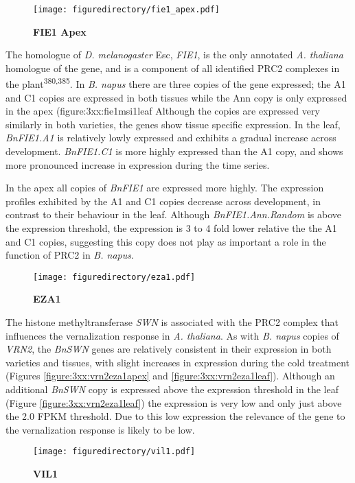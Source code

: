 \documentclass[12pt,]{book}
\begin{document}
\begin{figure}[htbp]
\centering
\texttt{[image: figuredirectory/fie1\_apex.pdf]}
\caption{\textbf{FIE1 Apex}}\label{figure:3xx:fie1apex}
\end{figure}

The homologue of \emph{D. melanogaster} Esc, \emph{FIE1}, is the only
annotated \emph{A. thaliana} homologue of the gene, and is a component
of all identified PRC2 complexes in the plant\textsuperscript{380,385}.
In \emph{B. napus} there are three copies of the gene expressed; the A1
and C1 copies are expressed in both tissues while the Ann copy is only
expressed in the apex (figure:3xx:fie1msi1leaf Although the copies are
expressed very similarly in both varieties, the genes show tissue
specific expression. In the leaf, \emph{BnFIE1.A1} is relatively lowly
expressed and exhibits a gradual increase across development.
\emph{BnFIE1.C1} is more highly expressed than the A1 copy, and shows
more pronounced increase in expression during the time series.

In the apex all copies of \emph{BnFIE1} are expressed more highly. The
expression profiles exhibited by the A1 and C1 copies decrease across
development, in contrast to their behaviour in the leaf. Although
\emph{BnFIE1.Ann.Random} is above the expression threshold, the
expression is 3 to 4 fold lower relative the the A1 and C1 copies,
suggesting this copy does not play as important a role in the function
of PRC2 in \emph{B. napus}.

\begin{figure}[htbp]
\centering
\texttt{[image: figuredirectory/eza1.pdf]}
\caption{\textbf{EZA1}}\label{figure:3xx:eza1apex}
\end{figure}

The histone methyltransferase \emph{SWN} is associated with the PRC2
complex that influences the vernalization response in \emph{A.
thaliana}. As with \emph{B. napus} copies of \emph{VRN2}, the
\emph{BnSWN} genes are relatively consistent in their expression in both
varieties and tissues, with slight increases in expression during the
cold treatment (Figures \ref{figure:3xx:vrn2eza1apex} and
\ref{figure:3xx:vrn2eza1leaf}). Although an additional \emph{BnSWN} copy
is expressed above the expression threshold in the leaf (Figure
\ref{figure:3xx:vrn2eza1leaf}) the expression is very low and only just
above the 2.0 FPKM threshold. Due to this low expression the relevance
of the gene to the vernalization response is likely to be low.

\begin{figure}[htbp]
\centering
\texttt{[image: figuredirectory/vil1.pdf]}
\caption{\textbf{VIL1}}\label{figure:3xx:vil1}
\end{figure}
\end{document}
